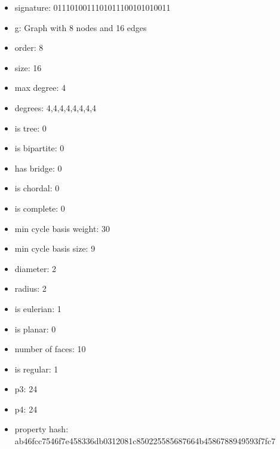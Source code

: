 \begin{itemize}
\item signature: 0111010011101011100101010011
\item g: Graph with 8 nodes and 16 edges
\item order: 8
\item size: 16
\item max degree: 4
\item degrees: 4,4,4,4,4,4,4,4
\item is tree: 0
\item is bipartite: 0
\item has bridge: 0
\item is chordal: 0
\item is complete: 0
\item min cycle basis weight: 30
\item min cycle basis size: 9
\item diameter: 2
\item radius: 2
\item is eulerian: 1
\item is planar: 0
\item number of faces: 10
\item is regular: 1
\item p3: 24
\item p4: 24
\item property hash: ab46fcc7546f7e458336db0312081c850225585687664b4586788949593f7fc7
\end{itemize}
\newpage
\begin{figure}
\end{figure}
